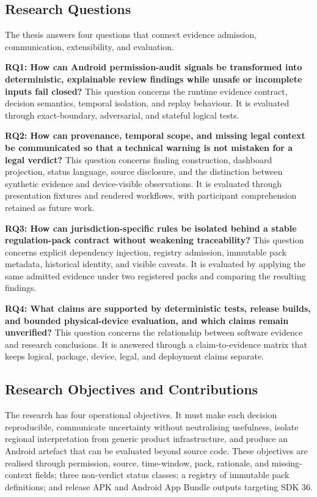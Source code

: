 \subsection{Research Questions}

The thesis answers four questions that connect evidence admission, communication, extensibility, and evaluation.

\textbf{RQ1: How can Android permission-audit signals be transformed into deterministic, explainable review findings while unsafe or incomplete inputs fail closed?} This question concerns the runtime evidence contract, decision semantics, temporal isolation, and replay behaviour. It is evaluated through exact-boundary, adversarial, and stateful logical tests.

\textbf{RQ2: How can provenance, temporal scope, and missing legal context be communicated so that a technical warning is not mistaken for a legal verdict?} This question concerns finding construction, dashboard projection, status language, source disclosure, and the distinction between synthetic evidence and device-visible observations. It is evaluated through presentation fixtures and rendered workflows, with participant comprehension retained as future work.

\textbf{RQ3: How can jurisdiction-specific rules be isolated behind a stable regulation-pack contract without weakening traceability?} This question concerns explicit dependency injection, registry admission, immutable pack metadata, historical identity, and visible caveats. It is evaluated by applying the same admitted evidence under two registered packs and comparing the resulting findings.

\textbf{RQ4: What claims are supported by deterministic tests, release builds, and bounded physical-device evaluation, and which claims remain unverified?} This question concerns the relationship between software evidence and research conclusions. It is answered through a claim-to-evidence matrix that keeps logical, package, device, legal, and deployment claims separate.

\subsection{Research Objectives and Contributions}

The research has four operational objectives. It must make each decision reproducible, communicate uncertainty without neutralising usefulness, isolate regional interpretation from generic product infrastructure, and produce an Android artefact that can be evaluated beyond source code. These objectives are realised through permission, source, time-window, pack, rationale, and missing-context fields; three non-verdict status classes; a registry of immutable pack definitions; and release APK and Android App Bundle outputs targeting SDK 36.

